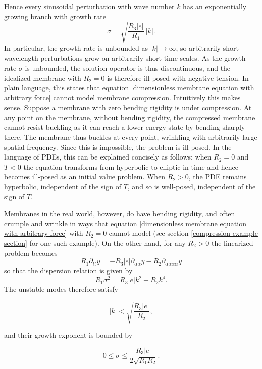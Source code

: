 \documentclass{article}[12pt]
\theoremstyle{Theorem}
\begin{document}
Hence every sinusoidal perturbation with wave number $k$ has an exponentially growing branch with growth rate
\[
\sigma = \sqrt{\frac{R_3|e|}{R_1}}\,|k|.
\]
In particular, the growth rate is unbounded as $|k|\rightarrow\infty$, so arbitrarily short-wavelength perturbations grow on arbitrarily short time scales. As the growth rate $\sigma$ is unbounded, the solution operator is thus discontinuous, and the idealized membrane with $R_2 = 0$ is therefore ill-posed with negative tension. In plain language, this states that equation \eqref{dimensionless membrane equation with arbitrary force} cannot model membrane compression. Intuitively this makes sense. Suppose a membrane with zero bending rigidity is under compression. At any point on the membrane, without bending rigidity, the compressed membrane cannot resist buckling as it can reach a lower energy state by bending sharply there. The membrane thus buckles at every point, wrinkling with arbitrarily large spatial frequency. Since this is impossible, the problem is ill-posed. In the language of PDEs, this can be explained concisely as follows: when $R_2 = 0$ and $T<0$ the equation transforms from hyperbolic to elliptic in time and hence becomes ill-posed as an initial value problem. When $R_2 > 0$, the PDE remains hyperbolic, independent of the sign of $T$, and so is well-posed, independent of the sign of $T$.
\newline

Membranes in the real world, however, do have bending rigidity, and often crumple and wrinkle in ways that equation \eqref{dimensionless membrane equation with arbitrary force} with $R_2 = 0$ cannot model (see section \ref{compression example section} for one such example). On the other hand, for any $R_2 >0$ the linearized problem becomes
\begin{equation}
R_1\partial_{tt}y = -R_3|e|\partial_{\alpha\alpha}y - R_2\partial_{\alpha\alpha\alpha\alpha}y
\label{linearized membrane equation with negative tension and R2}
\end{equation}
so that the dispersion relation is given by
\begin{equation}
R_1\sigma^2 = R_3|e|k^2 - R_2k^4.
\label{dispersion relation equation}
\end{equation}
The unstable modes therefore satisfy

$$
    |k| < \sqrt{\frac{R_3|e|}{R_2}},
$$

and their growth exponent is bounded by

$$
    0\leq \sigma \leq \frac{R_3|e|}{2\sqrt{R_1R_2}}.
$$
\end{document}
